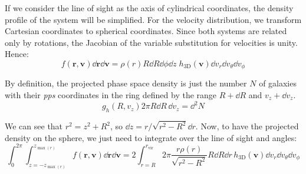 If we consider the line of sight as the axis of cylindrical coordinates, the
density profile of the system will be simplified. For the velocity
distribution, we transform Cartesian coordinates to spherical coordinates.
Since both systems are related only by rotations, the Jacobian of the variable
substitution for velocities is unity. Hence:
%
\begin{equation}
    f\left(\textbf{r},\textbf{v}\right)\dd\textbf{r}\dd\textbf{v}=
    \rho\left(r\right)R\dd{R}\dd\phi\dd{z}\;
    h_\mathrm{3D}\left(\textbf{v}\right)
    \dd{v_r}\dd{v_\theta}\dd{v_\phi}
\end{equation}

By definition, the projected phase space density is just the number $N$ of
galaxies with their \emph{pps} coordinates in the ring defined by the range
$R+\dd R$ and $v_z+\dd v_z$.
%
\begin{equation}
    g_h \left(R, v_z\right)2\pi R \dd R\, \dd v_z = \dd^2 N
\end{equation}

We can see that $r^2=z^2+R^2$, so $\dd{z}=r/\sqrt{r^2-R^2}\dd{r}$.
Now, to have the projected density on the sphere, we just need to integrate
over the line of sight and angles:
%
\begin{equation}
    \label{eq:intfunc}
    \int_0^{2\pi}\int_{z=-z_{\max\left(r\right)}}^{z_{\max\left(r\right)}}
    f\left(\textbf{r},\textbf{v}\right)\dd\textbf{r}
    \dd{\textbf{v}}=2\int_{r=R}^{r_{\mathrm{vir}}}2\pi
    \frac{r\rho\left(r\right)}{\sqrt{r^2-R^2}}R\dd R\dd r\,
    h_\mathrm{3D}\left(\textbf{v}\right)\dd v_r\dd v_\theta\dd v_\phi
\end{equation}

